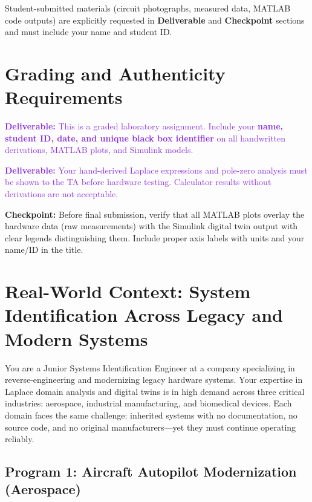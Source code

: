 \documentclass[11pt,letterpaper]{article}
\providecommand{\cpECE}[1]{\textcolor{OliveGreen}{\textbf{Checkpoint:} #1}}
\providecommand{\delECE}[1]{\textcolor{BlueViolet}{\textbf{Deliverable:} #1}}
\begin{document}
\noindent Student-submitted materials (circuit photographs, measured data, MATLAB code outputs) are explicitly requested in \textbf{Deliverable} and \textbf{Checkpoint} sections and must include your name and student ID.

\clearpage

\section*{Grading and Authenticity Requirements}
\delECE{This is a graded laboratory assignment. Include your \textbf{name, student ID, date, and unique black box identifier} on all handwritten derivations, MATLAB plots, and Simulink models.}

\delECE{Your hand-derived Laplace expressions and pole-zero analysis must be shown to the TA before hardware testing. Calculator results without derivations are not acceptable.}

\cpECE{Before final submission, verify that all MATLAB plots overlay the hardware data (raw measurements) with the Simulink digital twin output with clear legends distinguishing them. Include proper axis labels with units and your name/ID in the title.}

\clearpage

\section{Real-World Context: System Identification Across Legacy and Modern Systems}

\noindent
You are a Junior Systems Identification Engineer at a company specializing in reverse-engineering and modernizing legacy hardware systems. Your expertise in Laplace domain analysis and digital twins is in high demand across three critical industries: aerospace, industrial manufacturing, and biomedical devices. Each domain faces the same challenge: inherited systems with no documentation, no source code, and no original manufacturers—yet they must continue operating reliably.

\subsection{Program 1: Aircraft Autopilot Modernization (Aerospace)}
\end{document}
